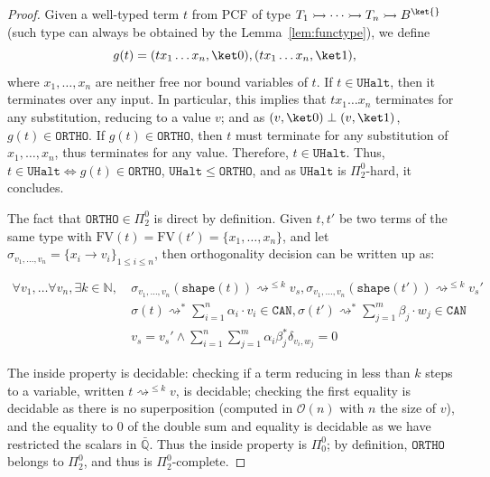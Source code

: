 \documentclass[10pt,a4paper]{article}
\newcommand{\tvar}{T}
\newcommand{\bvar}{B}
\newcommand\bkvar{\bvar^{\ket{}}}
\newcommand{\anyfunc}{\rightarrowtail}
\newcommand{\zket}{\ket 0}
\newcommand{\oket}{\ket 1}
\newcommand{\shape}[1]{\mathtt{shape}(#1)}
\newcommand{\can}{\ensuremath{\mathtt{CAN}}}
\newcommand{\fv}[1]{\mathrm{FV}(#1)}
\newcommand{\pitwo}{\Pi_2^0}
\newcommand{\portho}{\mathtt{ORTHO}}
\newcommand{\uhalt}{\mathtt{UHalt}}
\newcommand\kron[2]{\delta_{#1, #2}}
\newcommand{\subarrow}{\to}
\newcommand{\reduces}{\rightsquigarrow}
\newcommand{\sreduces}{\reduces^*}
\newcommand{\mostreduces}[1]{\ensuremath{\reduces^{\leq #1}}}
\newcommand{\mcal}{\mathcal}
\begin{document}
\begin{proof}
  Given a well-typed term $t$ from PCF of type $\tvar_1 \anyfunc
  \dots \anyfunc \tvar_n \anyfunc \bkvar$
  (such type can always be obtained by the Lemma~\ref{lem:functype}),
  we define
  \[
    g(t) = (tx_1\dots x_n, \zket), (tx_1\dots x_n, \oket),
  \]
  where $x_1, \dots, x_n$ are neither free nor bound variables of $t$.
  If $t \in \uhalt$, then it terminates over any input.
  In particular, this implies that $tx_1 \dots x_n$ terminates for
  any substitution, reducing to a value $v$;
  and as $(v, \zket) \perp (v, \oket)$, $g(t) \in \portho$.
  If $g(t) \in \portho$, then $t$ must terminate for any substitution
  of $x_1, \dots, x_n$, thus terminates for any value.
  Therefore, $t \in \uhalt$.
  Thus, $t \in \uhalt \iff g(t) \in \portho$, $\uhalt \leq
  \portho$, and as $\uhalt$ is $\pitwo$-hard, it concludes.

  The fact that $\portho \in \pitwo$ is direct by definition.
  Given $t, t'$ be two terms of the same type with $\fv t = \fv{t'} =
  \{x_1, \dots, x_n\}$, and let $\sigma_{v_1, \dots, v_n} = \{x_i
  \subarrow v_i\}_{1 \leq i \leq n}$, then orthogonality decision can
  be written up as:

  \[
    \begin{aligned}
      \forall v_1, \dots \forall v_n, \exists k \in \mathbb
      N,\ &\sigma_{v_1, \dots, v_n}(\shape t) \mostreduces{k} v_s,
      \sigma_{v_1, \dots, v_n}(\shape{t'}) \reduces^{\leq k} v_s'  \\
      &\sigma(t) \sreduces \sum_{i=1}^n \alpha_i \cdot v_i \in
      \can, \sigma(t') \sreduces \sum_{j=1}^m \beta_j \cdot w_j
      \in \can \\
      & v_s = v_s' \wedge \sum_{i=1}^n \sum_{j=1}^m \alpha_i
      \beta_j^* \kron{v_i}{w_j} = 0
    \end{aligned}
  \]

  The inside property is decidable: checking if a term reducing in
  less than $k$ steps to a variable, written $t \mostreduces{k} v$,
  is decidable; checking the first equality is decidable as there is
  no superposition (computed in $\mcal O(n)$ with $n$ the size of
  $v$), and the equality to $0$ of the double sum and equality is
  decidable as we have restricted the scalars in $\bar{\mathbb Q}$.
  Thus the inside property is $\Pi_0^0$; by definition, $\portho$
  belongs to $\pitwo$, and thus is $\pitwo$-complete. \qedhere

\end{proof}

\ortholower*
\end{document}

